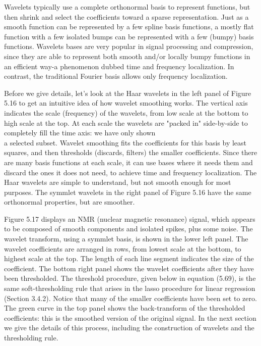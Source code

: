 \documentclass[10pt]{article}
\begin{document}
Wavelets typically use a complete orthonormal basis to represent functions, but then shrink and select the coefficients toward a sparse representation. Just as a smooth function can be represented by a few spline basis functions, a mostly flat function with a few isolated bumps can be represented with a few (bumpy) basis functions. Wavelets bases are very popular in signal processing and compression, since they are able to represent both smooth and/or locally bumpy functions in an efficient way-a phenomenon dubbed time and frequency localization. In contrast, the traditional Fourier basis allows only frequency localization.

Before we give details, let's look at the Haar wavelets in the left panel of Figure 5.16 to get an intuitive idea of how wavelet smoothing works. The vertical axis indicates the scale (frequency) of the wavelets, from low scale at the bottom to high scale at the top. At each scale the wavelets are "packed in" side-by-side to completely fill the time axis: we have only shown\\
a selected subset. Wavelet smoothing fits the coefficients for this basis by least squares, and then thresholds (discards, filters) the smaller coefficients. Since there are many basis functions at each scale, it can use bases where it needs them and discard the ones it does not need, to achieve time and frequency localization. The Haar wavelets are simple to understand, but not smooth enough for most purposes. The symmlet wavelets in the right panel of Figure 5.16 have the same orthonormal properties, but are smoother.

Figure 5.17 displays an NMR (nuclear magnetic resonance) signal, which appears to be composed of smooth components and isolated spikes, plus some noise. The wavelet transform, using a symmlet basis, is shown in the lower left panel. The wavelet coefficients are arranged in rows, from lowest scale at the bottom, to highest scale at the top. The length of each line segment indicates the size of the coefficient. The bottom right panel shows the wavelet coefficients after they have been thresholded. The threshold procedure, given below in equation (5.69), is the same soft-thresholding rule that arises in the lasso procedure for linear regression (Section 3.4.2). Notice that many of the smaller coefficients have been set to zero. The green curve in the top panel shows the back-transform of the thresholded coefficients: this is the smoothed version of the original signal. In the next section we give the details of this process, including the construction of wavelets and the thresholding rule.
\end{document}
